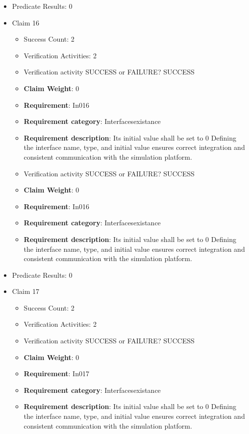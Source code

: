\documentclass{article}
\begin{document}
\begin{itemize}
									    
				\item Predicate Results: 0

  				  \item Claim 16
				\begin{itemize}
			    	\item Success Count: 2 
			    	\item Verification Activities: 2
					\item Verification activity SUCCESS or FAILURE? SUCCESS
					\item \textbf{Claim Weight}: 0
						\item \textbf{Requirement}: In016 
						\item \textbf{Requirement category}: Interfacesexistance 
						\item \textbf{Requirement description}: Its initial value shall be set to 0 Defining the interface name, type, and initial value ensures correct integration and consistent communication with the simulation platform.
					
					\item Verification activity SUCCESS or FAILURE? SUCCESS
					\item \textbf{Claim Weight}: 0
						\item \textbf{Requirement}: In016 
						\item \textbf{Requirement category}: Interfacesexistance 
						\item \textbf{Requirement description}: Its initial value shall be set to 0 Defining the interface name, type, and initial value ensures correct integration and consistent communication with the simulation platform.
					
				\end{itemize}
				
									    
				\item Predicate Results: 0

  				  \item Claim 17
				\begin{itemize}
			    	\item Success Count: 2 
			    	\item Verification Activities: 2
					\item Verification activity SUCCESS or FAILURE? SUCCESS
					\item \textbf{Claim Weight}: 0
						\item \textbf{Requirement}: In017 
						\item \textbf{Requirement category}: Interfacesexistance 
						\item \textbf{Requirement description}: Its initial value shall be set to 0 Defining the interface name, type, and initial value ensures correct integration and consistent communication with the simulation platform.
					

\end{itemize}
\end{itemize}
\end{document}
